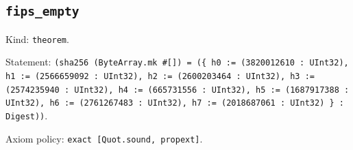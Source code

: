 \documentclass[11pt]{article}
\begin{document}
\subsection*{\texttt{fips\_empty}}
\noindent Kind: \texttt{theorem}.\par
\noindent Statement: \texttt{(sha256 (ByteArray.mk \#[]) = (\{ h0 := (3820012610 : UInt32), h1 := (2566659092 : UInt32), h2 := (2600203464 : UInt32), h3 := (2574235940 : UInt32), h4 := (665731556 : UInt32), h5 := (1687917388 : UInt32), h6 := (2761267483 : UInt32), h7 := (2018687061 : UInt32) \} : Digest))}.\par
\noindent Axiom policy: \texttt{exact [Quot.sound, propext]}.\par
\end{document}
